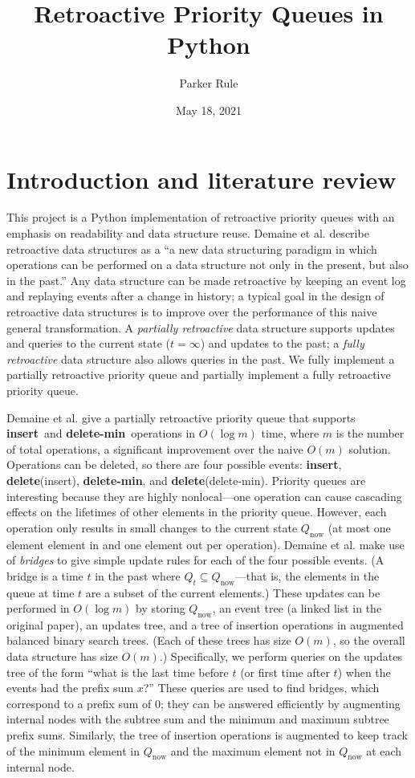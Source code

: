 \documentclass{article}
\title{Retroactive Priority Queues in Python}
\author{Parker Rule}
\date{May 18, 2021}
\newcommand{\insertop}{\textbf{insert}}
\newcommand{\delinsert}{\textbf{delete}(insert)}
\newcommand{\deletemin}{\textbf{delete-min}}
\newcommand{\deldelmin}{\textbf{delete}(delete-min)}
\newcommand{\Qnow}{Q_{\text{now}}}
\begin{document}
\maketitle

\section{Introduction and literature review}
This project is a Python implementation of retroactive priority queues with an emphasis on readability and data structure reuse. Demaine et al. \cite{demaine2007retroactive}  describe retroactive data structures as a ``a new data structuring paradigm in which operations can be performed on a
data structure not only in the present, but also in the past.'' Any data structure can be made retroactive by keeping an event log and replaying events after a change in history; a typical goal in the design of retroactive data structures is to improve over the performance of this naive general transformation. A \emph{partially retroactive} data structure supports updates and queries to the current state ($t = \infty$) and updates to the past; a \emph{fully retroactive} data structure also allows queries in the past. We fully implement a partially retroactive priority queue and partially implement a fully retroactive priority queue.

Demaine et al. \cite{demaine2007retroactive} give a partially retroactive priority queue that supports \insertop\ and \deletemin\ operations in $O(\log m)$ time, where $m$ is the number of total operations, a significant improvement over the naive $O(m)$ solution. Operations can be deleted, so there are four possible events: \insertop, \delinsert, \deletemin, and \deldelmin. Priority queues are interesting because they are highly nonlocal---one operation can cause cascading effects on the lifetimes of other elements in the priority queue. However, each operation only results in small changes to the current state $\Qnow$ (at most one element element in and one element out per operation). Demaine et al. make use of \emph{bridges} to give simple update rules for each of the four possible events. (A bridge is a time $t$ in the past where $Q_t \subseteq \Qnow$---that is, the elements in the queue at time $t$ are a subset of the current elements.) These updates can be performed in $O(\log m)$ by storing $\Qnow$, an event tree (a linked list in the original paper), an updates tree, and a tree of insertion operations in augmented balanced binary search trees. (Each of these trees has size $O(m)$, so the overall data structure has size $O(m)$.) Specifically, we perform queries on the updates tree of the form ``what is the last time before $t$ (or first time after $t$) when the events had the prefix sum $x$?'' These queries are used to find bridges, which correspond to a prefix sum of 0; they can be answered efficiently by augmenting internal nodes with the subtree sum and the minimum and maximum subtree prefix sums. Similarly, the tree of insertion operations is augmented to keep track of the minimum element in $\Qnow$ and the maximum element not in $\Qnow$ at each internal node.
\end{document}

